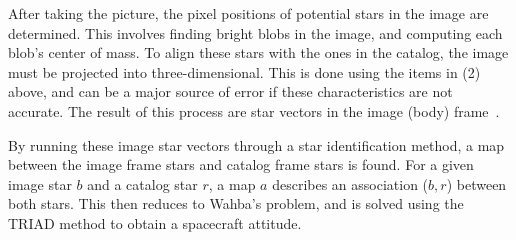 After taking the picture, the pixel positions of potential stars in the image are determined.
This involves finding bright blobs in the image, and computing each blob's center of mass.
To align these stars with the ones in the catalog, the image must be projected into three-dimensional.
This is done using the items in (2) above, and can be a major source of error if these
characteristics are not accurate.
The result of this process are star vectors in the image (body) frame~\cite{Tappe}.

By running these image star vectors through a star identification method, a map between the image frame stars and
catalog frame stars is found.
For a given image star $b$ and a catalog star $r$, a map $a$ describes an association ($b, r$) between both stars.
This then reduces to Wahba's problem, and is solved using the TRIAD method to obtain a spacecraft attitude.